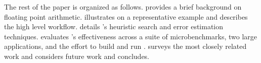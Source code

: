 \documentclass[paper.tex]{subfiles}
\begin{document}
The rest of the paper is organized as follows.  
provides a brief background on floating point arithmetic.
 illustrates \casio on a representative example and
describes the high level \casio workflow.  
details \casio's heuristic search and error estimation techniques.
 evaluates \casio's effectiveness across a suite
of microbenchmarks, two large applications, and the effort to build
and run \casio.   surveys the most closely
related work and  considers future work and
concludes.









\end{document}
